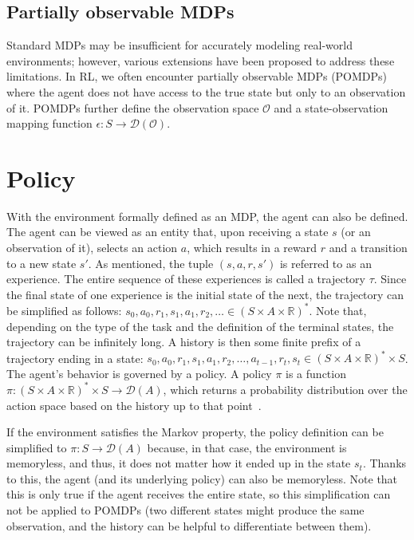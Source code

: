 \documentclass[
  digital,     %
  oneside,     %
  nosansbold,  %
  nocolorbold, %
  lof,         %
  lot,         %
]{fithesis4}
\begin{document}
\subsection{Partially observable MDPs}
Standard MDPs may be insufficient for accurately modeling real-world environments; however, various extensions have been proposed to address these limitations. In RL, we often encounter partially observable MDPs (POMDPs) where the agent does not have access to the true state but only to an observation of it. POMDPs further define the observation space $\mathcal{O}$ and a state-observation mapping function $\epsilon \colon S \to \mathcal{D}(\mathcal{O})$.

\section{Policy}
With the environment formally defined as an MDP, the agent can also be defined. The agent can be viewed as an entity that, upon receiving a state $s$ (or an observation of it), selects an action $a$, which results in a reward $r$ and a transition to a new state $s'$. As mentioned, the tuple $(s, a, r, s')$ is referred to as an experience. The entire sequence of these experiences is called a trajectory $\tau$. Since the final state of one experience is the initial state of the next, the trajectory can be simplified as follows: $s_0,a_0,r_1,s_1,a_1,r_2,\dotsc \in (S\times A \times \mathbb{R})^{*}$. Note that, depending on the type of the task and the definition of the terminal states, the trajectory can be infinitely long. A history is then some finite prefix of a trajectory ending in a state: $s_0,a_0,r_1,s_1,a_1,r_2,\dotsc, a_{t-1},r_t,s_t\in (S\times A \times \mathbb{R})^{*}\times S$.
The agent's behavior is governed by a policy. A policy $\pi$ is a function $\pi\colon (S\times A \times \mathbb{R})^{*}\times S \to \mathcal{D}(A)$, which returns a probability distribution over the action space based on the history up to that point~\cite{PA230}.

If the environment satisfies the Markov property, the policy definition can be simplified to $\pi\colon S \to \mathcal{D}(A)$ because, in that case, the environment is memoryless, and thus, it does not matter how it ended up in the state $s_t$. Thanks to this, the agent (and its underlying policy) can also be memoryless. Note that this is only true if the agent receives the entire state, so this simplification can not be applied to POMDPs (two different states might produce the same observation, and the history can be helpful to differentiate between them).
\end{document}
